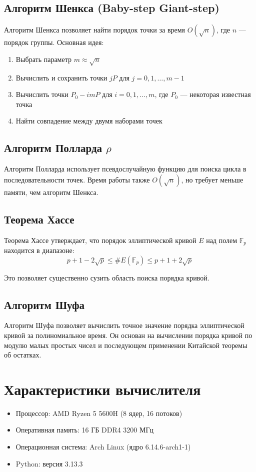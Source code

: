 \documentclass[a4paper,12pt]{article}
\begin{document}
\subsection{Алгоритм Шенкса (Baby-step Giant-step)}
Алгоритм Шенкса позволяет найти порядок точки за время $O(\sqrt{n})$, где $n$ — порядок группы. Основная идея:
\begin{enumerate}
    \item Выбрать параметр $m \approx \sqrt{n}$
    \item Вычислить и сохранить точки $jP$ для $j = 0, 1, \ldots, m-1$
    \item Вычислить точки $P_0 - imP$ для $i = 0, 1, \ldots, m$, где $P_0$ — некоторая известная точка
    \item Найти совпадение между двумя наборами точек
\end{enumerate}

\subsection{Алгоритм Полларда $\rho$}
Алгоритм Полларда использует псевдослучайную функцию для поиска цикла в последовательности точек. Время работы также $O(\sqrt{n})$, но требует меньше памяти, чем алгоритм Шенкса.

\subsection{Теорема Хассе}
Теорема Хассе утверждает, что порядок эллиптической кривой $E$ над полем $\mathbb{F}_p$ находится в диапазоне:
\begin{equation}
p + 1 - 2\sqrt{p} \leq \#E(\mathbb{F}_p) \leq p + 1 + 2\sqrt{p}
\end{equation}

Это позволяет существенно сузить область поиска порядка кривой.

\subsection{Алгоритм Шуфа}
Алгоритм Шуфа позволяет вычислить точное значение порядка эллиптической кривой за полиномиальное время. Он основан на вычислении порядка кривой по модулю малых простых чисел и последующем применении Китайской теоремы об остатках.

\section{Характеристики вычислителя}
\begin{itemize}
    \item Процессор:  AMD Ryzen 5 5600H (8 ядер, 16 потоков)
    \item Оперативная память: 16 ГБ DDR4 3200 МГц
    \item Операционная система: Arch Linux (ядро 6.14.6-arch1-1)
    \item Python: версия 3.13.3
\end{itemize}
\end{document}
